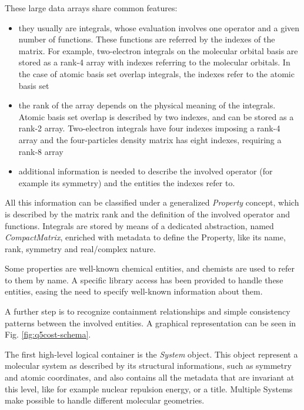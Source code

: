 These large data arrays share common features:
\begin{itemize}
\item they usually are integrals, whose evaluation involves one
operator and a given number of functions. These functions are
referred by the indexes of the matrix. For example, two-electron integrals
on the molecular orbital basis are stored as a rank-4 array with indexes
referring to the molecular orbitals. In the case of atomic basis set overlap
integrals, the indexes refer to the atomic basis set
\item the rank of the array depends on the physical meaning of the
integrals. Atomic basis set overlap is described by two indexes, and can be
stored as a rank-2 array. Two-electron integrals have four indexes imposing a
rank-4 array and the four-particles density matrix has eight indexes,
requiring a rank-8 array
\item additional information is needed to describe the involved operator
(for example its symmetry) and the entities the indexes refer to.
\end{itemize}

All this information can be classified under a generalized \textit{Property}
concept, which is described by the matrix rank and the definition of the
involved operator and functions. Integrals are stored by means of a
dedicated abstraction, named \textit{CompactMatrix}, enriched with
metadata to define the Property, like its name, rank, symmetry and
real/complex nature.

Some properties are well-known chemical entities, and chemists are
used to refer to them by name. A specific library access has been provided
to handle these entities, easing the need to specify well-known information
about them.

A further step is to recognize containment relationships and simple
consistency patterns between the involved entities. A graphical
representation can be seen in Fig. \ref{fig:q5cost-schema}.



The first high-level logical container is the \textit{System} object. This
object represent a molecular system as described by its structural
informations, such as symmetry and atomic coordinates, and also contains all
the metadata that are invariant at this level, like for example nuclear
repulsion energy, or a title. Multiple Systems make possible to handle
different molecular geometries.


